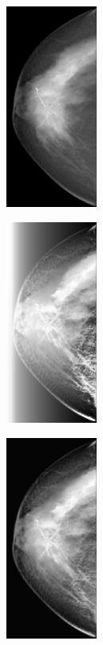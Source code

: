 \documentclass[spanish,twocolumn]{article}
\begin{document}
{\begin{minipage}[b]{1.0\linewidth}
\end{minipage}

\noindent\begin{minipage}[b]{1.0\linewidth}
  \centering
   
   \begin{minipage}[t]{0.3\linewidth}  
   		\centering
        \includegraphics[width=3cm]{Figures/entropia_local_ssim/imagen6.png}
  	\end{minipage}
  \hspace{1pt}
   \begin{minipage}[t]{0.3\linewidth}  
   		\centering
        \includegraphics[width=3cm]{Figures/entropia_local_ssim/imagen6_2_19_1.png}
  	\end{minipage}
  \hspace{1pt}
   \begin{minipage}[t]{0.3\linewidth}  
   		\centering
        \includegraphics[width=3cm]{Figures/entropia_local_ssim/imagen6_2_11_0-015063.png}

\end{minipage}
\end{minipage}}
\end{document}

